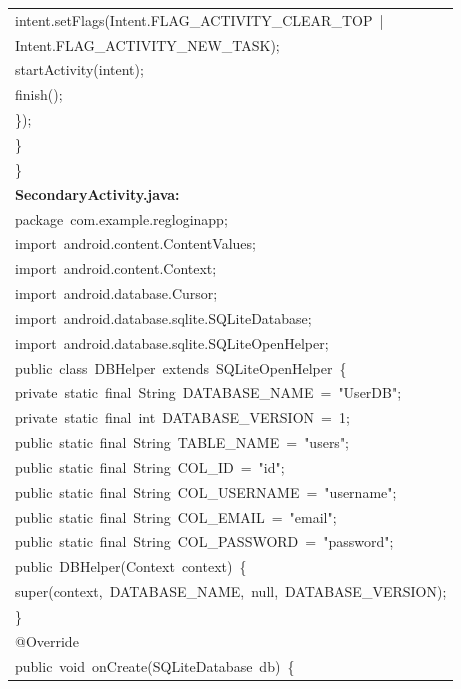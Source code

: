 \documentclass[a4paper,12pt]{article}
\begin{document}
\begin{longtable}{|p{}|}
{\ttfamily\small intent.setFlags(Intent.FLAG\_ACTIVITY\_CLEAR\_TOP\ |} \\
{\ttfamily\small Intent.FLAG\_ACTIVITY\_NEW\_TASK);} \\
{\ttfamily\small startActivity(intent);} \\
{\ttfamily\small finish();} \\
{\ttfamily\small \});} \\
{\ttfamily\small \}} \\
{\ttfamily\small \}} \\
\hline
\rule{0pt}{13pt}\textbf{SecondaryActivity.java:} \\
\hline
{\ttfamily\small package\ com.example.regloginapp;} \\
{\ttfamily\small import\ android.content.ContentValues;} \\
{\ttfamily\small import\ android.content.Context;} \\
{\ttfamily\small import\ android.database.Cursor;} \\
{\ttfamily\small import\ android.database.sqlite.SQLiteDatabase;} \\
{\ttfamily\small import\ android.database.sqlite.SQLiteOpenHelper;} \\
{\ttfamily\small public\ class\ DBHelper\ extends\ SQLiteOpenHelper\ \{} \\
{\ttfamily\small private\ static\ final\ String\ DATABASE\_NAME\ =\ "UserDB";} \\
{\ttfamily\small private\ static\ final\ int\ DATABASE\_VERSION\ =\ 1;} \\
{\ttfamily\small public\ static\ final\ String\ TABLE\_NAME\ =\ "users";} \\
{\ttfamily\small public\ static\ final\ String\ COL\_ID\ =\ "id";} \\
{\ttfamily\small public\ static\ final\ String\ COL\_USERNAME\ =\ "username";} \\
{\ttfamily\small public\ static\ final\ String\ COL\_EMAIL\ =\ "email";} \\
{\ttfamily\small public\ static\ final\ String\ COL\_PASSWORD\ =\ "password";} \\
{\ttfamily\small public\ DBHelper(Context\ context)\ \{} \\
{\ttfamily\small super(context,\ DATABASE\_NAME,\ null,\ DATABASE\_VERSION);} \\
{\ttfamily\small \}} \\
{\ttfamily\small @Override} \\
{\ttfamily\small public\ void\ onCreate(SQLiteDatabase\ db)\ \{} \\

\end{longtable}
\end{document}
